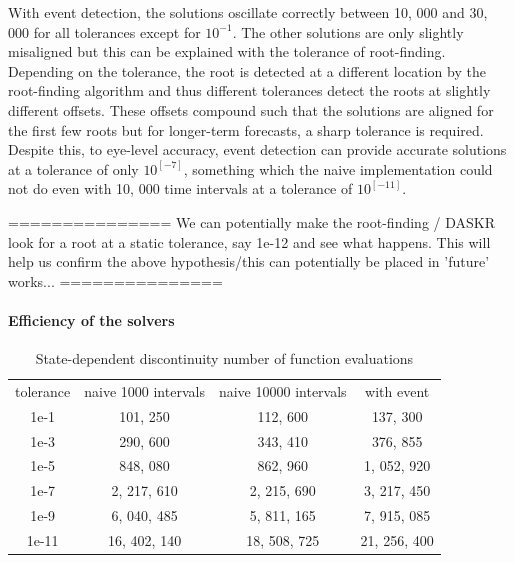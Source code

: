 \documentclass{article}
\begin{document}
With event detection, the solutions oscillate correctly between 10, 000 and 30, 000 for all tolerances except for $10^{-1}$. The other solutions are only slightly misaligned but this can be explained with the tolerance of root-finding. Depending on the tolerance, the root is detected at a different location by the root-finding algorithm and thus different tolerances detect the roots at slightly different offsets. These offsets compound such that the solutions are aligned for the first few roots but for longer-term forecasts, a sharp tolerance is required. Despite this, to eye-level accuracy, event detection can provide accurate solutions at a tolerance of only $10^[-7]$, something which the naive implementation could not do even with 10, 000 time intervals at a tolerance of $10^[-11]$.

===============
We can potentially make the root-finding / DASKR look for a root at a static tolerance, say 1e-12 and see what happens. This will help us confirm the above hypothesis/this can potentially be placed in 'future' works...
===============

\paragraph{Efficiency of the solvers}
\begin{table}[h]
\caption {State-dependent discontinuity number of function evaluations} 
\label{tab:pde_state_tol_study}
\begin{center}
\begin{tabular}{ c c c c } 
tolerance & naive 1000 intervals & naive 10000 intervals & with event \\ 
1e-1      &             101, 250 &              112, 600 &     137, 300 \\
1e-3      &             290, 600 &              343, 410 &     376, 855 \\
1e-5      &             848, 080 &              862, 960 &  1, 052, 920 \\
1e-7      &          2, 217, 610 &           2, 215, 690 &  3, 217, 450\\
1e-9      &          6, 040, 485 &           5, 811, 165 &  7, 915, 085  \\
1e-11     &         16, 402, 140 &          18, 508, 725 & 21, 256, 400 \\
\end{tabular}
\end{center}
\end{table}
\end{document}
